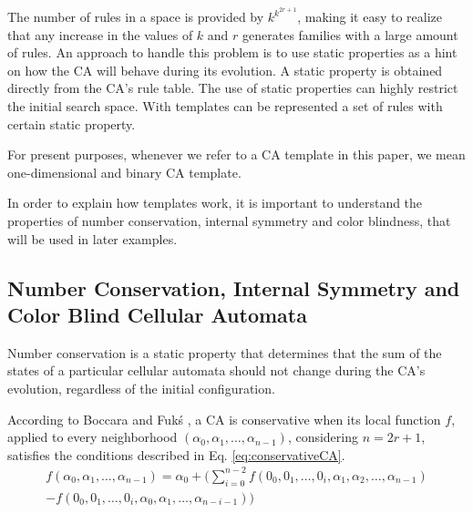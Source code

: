 \documentclass{llncs}
\begin{document}



The number of rules in a space is provided by $k^{k^{2r+1}}$, making it easy to realize that any increase in the values of $k$ and $r$ generates families with a large amount of rules. An approach to handle this problem is to use static properties as a hint on how the CA will behave during its evolution. A static property is obtained directly from the CA's rule table. The use of static properties can highly restrict the initial search space. With templates can be represented a set of rules with certain static property.

For present purposes, whenever we refer to a CA template in this paper, we mean one-dimensional and binary CA template.

In order to explain how templates work, it is important to understand the properties of number conservation, internal symmetry and color blindness, that will be used in later examples.

\subsection{Number Conservation, Internal Symmetry and Color Blind Cellular Automata}
Number conservation is a static property that determines that the sum of the states of a particular cellular automata should not change during the CA's evolution, regardless of the initial configuration.

According to Boccara and Fukś \cite{boccara2002}, a CA is conservative when its local function $f$, applied to every neighborhood $(\alpha_0,\alpha_1, \dots, \alpha_{n-1})$, considering $n=2r+1$, satisfies the conditions described in Eq. \ref{eq:conservativeCA}.
\begin{equation}
\begin{split}
f(\alpha_0,\alpha_1, \dots,\alpha_{n-1}) = \alpha_0 + (\sum_{i=0}^{n-2}f(0_0,0_1, \dots,0_i,\alpha_1,\alpha_2, \dots,\alpha_{n-1}) \\- f(0_0,0_1, \dots,0_i,\alpha_0,\alpha_1, \dots,\alpha_{n-i-1}))
\label{eq:conservativeCA}
\end{split}
\end{equation}
\end{document}
